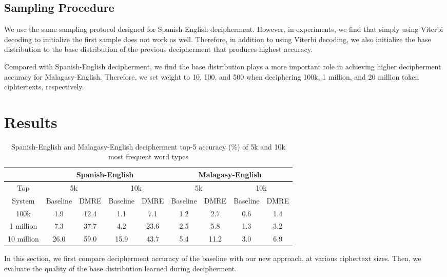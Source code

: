 \subsection{Sampling Procedure}

We use the same sampling protocol designed for Spanish-English decipherment. However, in experiments, we find that simply using Viterbi decoding to initialize the first sample does not work as well. Therefore, in addition to using Viterbi decoding, we also initialize the base distribution to the base distribution of the previous decipherment that produces highest accuracy.

Compared with Spanish-English decipherment, we find the base distribution plays a more important role in achieving higher decipherment accuracy for Malagasy-English. Therefore, we set weight to 10, 100, and 500 when deciphering 100k, 1 million, and 20 million token ciphtertexts, respectively.


\section{Results}

%
 \begin{table}[!ht]
 \begin{center}
 \begin{tabular}{ |c|c|c|c|c|c|c|c|c| } \hline
         & \multicolumn{4}{|c|}{Spanish-English} & \multicolumn{4}{|c|}{Malagasy-English} \\ \hline
 Top &  \multicolumn{2}{|c|}{5k} & \multicolumn{2}{|c|}{10k} & \multicolumn{2}{|c|}{5k} & \multicolumn{2}{|c|}{10k} \\ \hline
 System &  Baseline & DMRE & Baseline & DMRE &  Baseline & DMRE & Baseline & DMRE \\ \hline
 100k &  1.9 & 12.4 & 1.1 & 7.1 &  1.2 & 2.7 & 0.6 & 1.4 \\ \hline
 1 million &  7.3 & 37.7& 4.2 & 23.6 &  2.5 & 5.8 & 1.3 & 3.2 \\ \hline
 10 million &  26.0 & 59.0 & 15.9 & 43.7 &  5.4 & 11.2 & 3.0 & 6.9 \\ \hline
 \end{tabular}
 \caption{Spanish-English and Malagasy-English decipherment top-5 accuracy (\%) of 5k and 10k most frequent word types}
 \label{decipher-acc-result}
 \end{center}
 \end{table}
%

In this section, we first compare decipherment accuracy of the baseline with our new approach, at various ciphertext sizes. Then, we evaluate the quality of the base distribution learned during decipherment.

